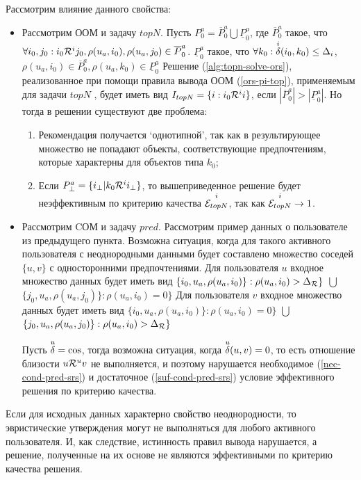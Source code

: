 Рассмотрим влияние данного свойства:
\begin{itemize}
	\item Рассмотрим ООМ и задачу $topN$. Пусть $P^a_0 = \overline{P}^a_0
		\bigcup \underline{P}^a_0$, где $\overline{P}^a_0$ такое, что $\forall
		i_0,j_0: i_0 \mathcal{R}^i j_0, \rho(u_a, i_0), \rho(u_a, j_0) \in
		\overline{P}^a_0$.
		$\underline{P}^a_0$ такое, что $\forall k_0: {\overset{i}{\mathcal{\delta}}}(i_0, k_0) \le \Delta_i$,
		$\rho(u_a, i_0) \in \overline{P}^a_0, \rho(u_a, k_0) \in \underline{P}^a_0$
		Решение (\ref{alg:topn-solve-ors}), реализованное при помощи правила
		вывода ООМ (\ref{ors-pi-top}), применяемым для задачи $topN$
		, будет иметь
		вид $I_{topN} = \{ i: i_0 \mathcal{R}^i i \}$,
		если $|\overline{P}^a_0| > |\underline{P}^a_0|$.
		Но тогда в решении существуют две проблема:
		\begin{enumerate}
			\item Рекомендация получается \lq однотипной\rq, так как в
				результирующее множество не попадают объекты, соответствующие
				предпочтениям, которые характерны для объектов типа $k_0$;
			\item Если $P^a_{\bot} = \{ i_{\bot} | k_0 \mathcal{R}^i i_{\bot}
				\}$, то вышеприведенное решение будет неэффективным по критерию
				качества ${\overset{i}{\mathcal{E}_{topN}}}$,
				так как ${\overset{i}{\mathcal{E}_{topN}}} \rightarrow 1$.
		\end{enumerate}

	\item Рассмотрим CОМ и задачу $pred$.
	Рассмотрим пример данных о пользователе из предыдущего пункта.
	Возможна ситуация, когда
	для такого активного пользователя с неоднородными данными будет составлено
	множество соседей $\{u,v\}$ с односторонними предпочтениями.
	Для пользователя $u$ входное множество данных будет иметь вид
		$\{i_0, u_a, \rho(u_a, i_0)\}: \rho(u_a, i_0) > \Delta_{\mathcal{R}} \}$
		$\bigcup$
		$\{j_0, u_a, \rho(u_a, j_0)\}: \rho(u_a, i_0) = 0 \}$
	Для пользователя $v$ входное множество данных будет иметь вид
		$\{i_0, u_a, \rho(u_a, i_0)\}: \rho(u_a, i_0) = 0 \}$
		$\bigcup$
		$\{j_0, u_a, \rho(u_a, j_0)\}: \rho(u_a, i_0) > \Delta_{\mathcal{R}} \}$

	Пусть ${\overset{u}{\mathcal{\delta}}} = \cos$, тогда возможна ситуация, когда ${\overset{u}{\mathcal{\delta}}}(u, v) = 0$, то есть отношение
	близости $u \mathcal{R}^u v$ не выполняется, и поэтому
	нарушается необходимое (\ref{nec-cond-pred-srs}) и
	достаточное (\ref{suf-cond-pred-srs})
	условие эффективного решения по критерию качества.
	\end{itemize}

\begin{assert}
	\label{ass:hetero}
Если для исходных данных характерно свойство неоднородности, то
эвристические утверждения могут не выполняться для любого активного
пользователя. И, как следствие, истинность правил вывода нарушается, а решение,
полученные на их основе не являются эффективными по критерию качества решения.
\end{assert}

